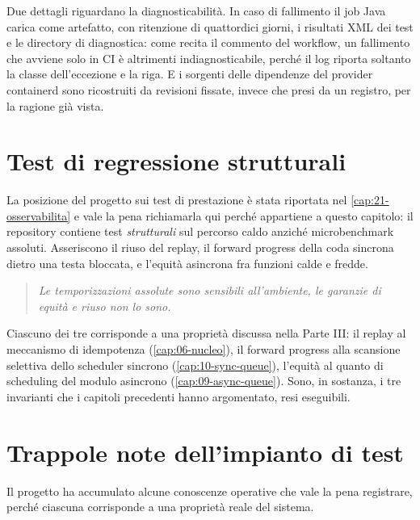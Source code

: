 Due dettagli riguardano la diagnosticabilit\`a. In caso di fallimento il job
Java carica come artefatto, con ritenzione di quattordici giorni, i risultati
XML dei test e le directory di diagnostica: come recita il commento del
workflow, un fallimento che avviene solo in CI \`e altrimenti indiagnosticabile,
perch\'e il log riporta soltanto la classe dell'eccezione e la riga. E i
sorgenti delle dipendenze del provider containerd sono ricostruiti da revisioni
fissate, invece che presi da un registro, per la ragione gi\`a vista.

\section{Test di regressione strutturali}

La posizione del progetto sui test di prestazione \`e stata riportata nel
\cref{cap:21-osservabilita} e vale la pena richiamarla qui perch\'e appartiene a
questo capitolo: il repository contiene test \emph{strutturali} sul percorso
caldo anzich\'e microbenchmark assoluti. Asseriscono il riuso del replay, il
forward progress della coda sincrona dietro una testa bloccata, e l'equit\`a
asincrona fra funzioni calde e fredde.

\begin{quote}\itshape
Le temporizzazioni assolute sono sensibili all'ambiente, le garanzie di equit\`a
e riuso non lo sono.
\end{quote}

Ciascuno dei tre corrisponde a una propriet\`a discussa nella Parte III: il
replay al meccanismo di idempotenza (\cref{cap:06-nucleo}), il forward progress
alla scansione selettiva dello scheduler sincrono (\cref{cap:10-sync-queue}),
l'equit\`a al quanto di scheduling del modulo asincrono
(\cref{cap:09-async-queue}). Sono, in sostanza, i tre invarianti che i capitoli
precedenti hanno argomentato, resi eseguibili.

\section{Trappole note dell'impianto di test}

Il progetto ha accumulato alcune conoscenze operative che vale la pena
registrare, perch\'e ciascuna corrisponde a una propriet\`a reale del sistema.

